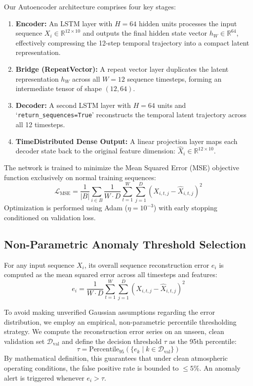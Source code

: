 \documentclass[conference]{IEEEtran}
\begin{document}
Our Autoencoder architecture comprises four key stages:
\begin{enumerate}
    \item \textbf{Encoder:} An LSTM layer with $H = 64$ hidden units processes the input sequence $X_i \in \mathbb{R}^{12 \times 10}$ and outputs the final hidden state vector $h_W \in \mathbb{R}^{64}$, effectively compressing the 12-step temporal trajectory into a compact latent representation.
    \item \textbf{Bridge (RepeatVector):} A repeat vector layer duplicates the latent representation $h_W$ across all $W = 12$ sequence timesteps, forming an intermediate tensor of shape $(12, 64)$.
    \item \textbf{Decoder:} A second LSTM layer with $H = 64$ units and `\texttt{return\_sequences=True}' reconstructs the temporal latent trajectory across all 12 timesteps.
    \item \textbf{TimeDistributed Dense Output:} A linear projection layer maps each decoder state back to the original feature dimension: $\hat{X}_i \in \mathbb{R}^{12 \times 10}$.
\end{enumerate}

The network is trained to minimize the Mean Squared Error (MSE) objective function exclusively on normal training sequences:
\begin{equation}
    \mathcal{L}_{\text{MSE}} = \frac{1}{|B|} \sum_{i \in B} \frac{1}{W \cdot D} \sum_{t=1}^W \sum_{j=1}^D (X_{i,t,j} - \hat{X}_{i,t,j})^2
\end{equation}
Optimization is performed using Adam ($\eta = 10^{-3}$) with early stopping conditioned on validation loss.

\subsection{Non-Parametric Anomaly Threshold Selection}
For any input sequence $X_i$, its overall sequence reconstruction error $e_i$ is computed as the mean squared error across all timesteps and features:
\begin{equation}
    e_i = \frac{1}{W \cdot D} \sum_{t=1}^W \sum_{j=1}^D (X_{i,t,j} - \hat{X}_{i,t,j})^2
\end{equation}

To avoid making unverified Gaussian assumptions regarding the error distribution, we employ an empirical, non-parametric percentile thresholding strategy. We compute the reconstruction error series on an unseen, clean validation set $\mathcal{D}_{\text{val}}$ and define the decision threshold $\tau$ as the 95th percentile:
\begin{equation}
    \tau = \text{Percentile}_{95}\left(\{e_k \mid k \in \mathcal{D}_{\text{val}}\}\right)
\end{equation}
By mathematical definition, this guarantees that under clean atmospheric operating conditions, the false positive rate is bounded to $\le 5\%$. An anomaly alert is triggered whenever $e_i > \tau$.
\end{document}
